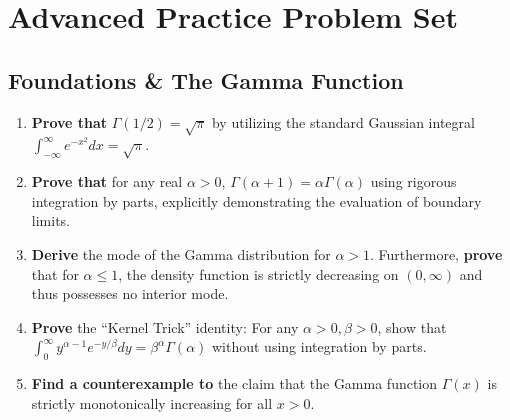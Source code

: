 \documentclass[11pt, a4paper]{article}
\theoremstyle{definition}
\theoremstyle{remark}
\begin{document}
\newpage

\section{Advanced Practice Problem Set}

\subsection{Foundations \& The Gamma Function}
\begin{enumerate}[label=\textbf{\arabic*.}]
    \item \textbf{Prove that} $\Gamma(1/2) = \sqrt{\pi}$ by utilizing the standard Gaussian integral $\int_{-\infty}^{\infty} e^{-x^2} dx = \sqrt{\pi}$.
    \item \textbf{Prove that} for any real $\alpha > 0$, $\Gamma(\alpha + 1) = \alpha \Gamma(\alpha)$ using rigorous integration by parts, explicitly demonstrating the evaluation of boundary limits.
    \item \textbf{Derive} the mode of the Gamma distribution for $\alpha > 1$. Furthermore, \textbf{prove} that for $\alpha \le 1$, the density function is strictly decreasing on $(0, \infty)$ and thus possesses no interior mode.
    \item \textbf{Prove} the ``Kernel Trick'' identity: For any $\alpha > 0, \beta > 0$, show that $\int_{0}^{\infty} y^{\alpha-1} e^{-y/\beta} dy = \beta^\alpha \Gamma(\alpha)$ without using integration by parts.
    \item \textbf{Find a counterexample to} the claim that the Gamma function $\Gamma(x)$ is strictly monotonically increasing for all $x > 0$.
\end{enumerate}
\end{document}
